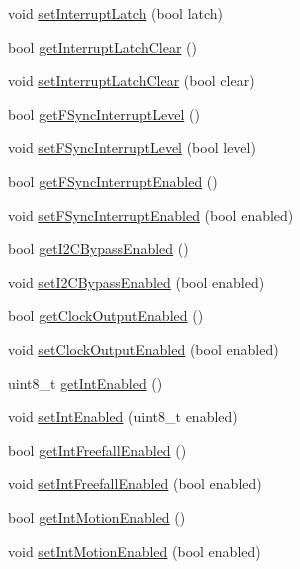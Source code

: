 \begin{DoxyCompactItemize}
\item 
void \mbox{\hyperlink{classMPU6050_abf9ccf9eb6c7156e6660abb76734920a}{set\+Interrupt\+Latch}} (bool latch)
\item 
bool \mbox{\hyperlink{classMPU6050_a9a098a607e20c64b60e155da35b8264f}{get\+Interrupt\+Latch\+Clear}} ()
\item 
void \mbox{\hyperlink{classMPU6050_a2fa64c7030242aac18bd6727e8ca4a54}{set\+Interrupt\+Latch\+Clear}} (bool clear)
\item 
bool \mbox{\hyperlink{classMPU6050_a60fc85d4f27f99d07ffb9543d5e5f347}{get\+F\+Sync\+Interrupt\+Level}} ()
\item 
void \mbox{\hyperlink{classMPU6050_a2b1c75cfc29e8ff8205f4ff33a426716}{set\+F\+Sync\+Interrupt\+Level}} (bool level)
\item 
bool \mbox{\hyperlink{classMPU6050_a4c01f9ab83b64dbbc6b62e658c3d3d9b}{get\+F\+Sync\+Interrupt\+Enabled}} ()
\item 
void \mbox{\hyperlink{classMPU6050_a96aa409e02cdb7d3671890c70b44f167}{set\+F\+Sync\+Interrupt\+Enabled}} (bool enabled)
\item 
bool \mbox{\hyperlink{classMPU6050_aed33db318a770d0020eb8b84058650f3}{get\+I2\+C\+Bypass\+Enabled}} ()
\item 
void \mbox{\hyperlink{classMPU6050_aa828160756a50f414aa3f5f5f0353c70}{set\+I2\+C\+Bypass\+Enabled}} (bool enabled)
\item 
bool \mbox{\hyperlink{classMPU6050_ada96c33957bf20c04ca598a3537358ef}{get\+Clock\+Output\+Enabled}} ()
\item 
void \mbox{\hyperlink{classMPU6050_a71ec4642b6f6c937bbf6a24fea4179e5}{set\+Clock\+Output\+Enabled}} (bool enabled)
\item 
uint8\+\_\+t \mbox{\hyperlink{classMPU6050_a295c9600579557df065aff88bc7a1d83}{get\+Int\+Enabled}} ()
\item 
void \mbox{\hyperlink{classMPU6050_ac7bcf24249dd5000320a8ec0ffe488c6}{set\+Int\+Enabled}} (uint8\+\_\+t enabled)
\item 
bool \mbox{\hyperlink{classMPU6050_a500bb2df2e46eaecd3fb2ba7304a5ed3}{get\+Int\+Freefall\+Enabled}} ()
\item 
void \mbox{\hyperlink{classMPU6050_a01a24a05f06463d5277e1670d6260e03}{set\+Int\+Freefall\+Enabled}} (bool enabled)
\item 
bool \mbox{\hyperlink{classMPU6050_a7de31a8e9f22765329d9f9e02db2f1f0}{get\+Int\+Motion\+Enabled}} ()
\item 
void \mbox{\hyperlink{classMPU6050_a2d2d1d3b03198a09c83a48ec3bc20bd8}{set\+Int\+Motion\+Enabled}} (bool enabled)

\end{DoxyCompactItemize}
